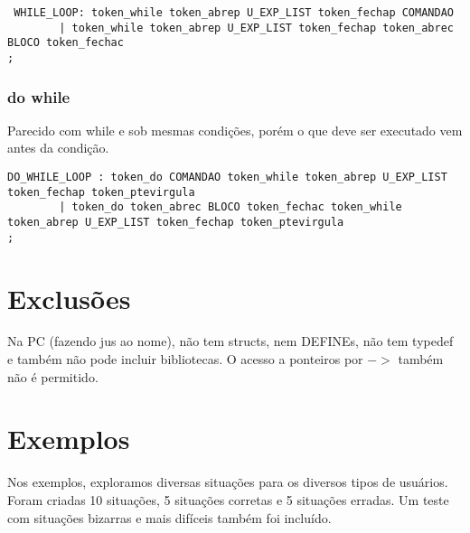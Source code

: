 \documentclass[a4paper,10pt]{article}
\begin{document}
\begin{verbatim}
 WHILE_LOOP: token_while token_abrep U_EXP_LIST token_fechap COMANDAO
	    | token_while token_abrep U_EXP_LIST token_fechap token_abrec BLOCO token_fechac
;
\end{verbatim}

\subsubsection{do while}

Parecido com while e sob mesmas condições, porém o que deve ser executado vem antes da condição.

\begin{verbatim}
DO_WHILE_LOOP : token_do COMANDAO token_while token_abrep U_EXP_LIST token_fechap token_ptevirgula
		| token_do token_abrec BLOCO token_fechac token_while token_abrep U_EXP_LIST token_fechap token_ptevirgula
;

\end{verbatim}

\section{Exclusões}
Na PC (fazendo jus ao nome), não tem structs, nem DEFINEs, não tem typedef e também não pode incluir bibliotecas. O acesso a ponteiros
por $->$ também não é permitido.

\section{Exemplos}
Nos exemplos, exploramos diversas situações para os diversos tipos de usuários. Foram criadas 10 situações, 5 situações corretas e 5 
situações erradas. Um teste com situações bizarras e mais difíceis também foi incluído.
\end{document}
